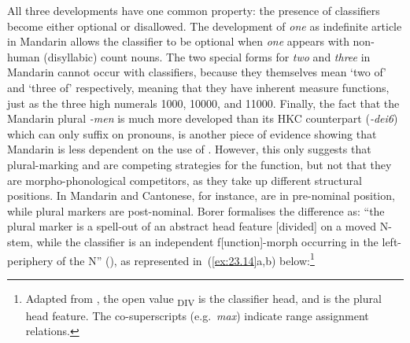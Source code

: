 \documentclass[output=paper]{langsci/langscibook}
\begin{document}
All three developments have one common property: the presence of classifiers
become either optional or disallowed. The development of \emph{one} as
indefinite article in Mandarin allows the classifier to be optional when
\emph{one} appears with non-human (disyllabic) count nouns. The two special
forms for \emph{two} and \emph{three} in Mandarin cannot occur with
classifiers, because they themselves mean ‘two of’ and ‘three of’ respectively,
meaning that they have inherent measure functions, just as the three high
numerals 1000, 10000, and 11000. Finally, the fact that the Mandarin plural
\emph{-men} is much more developed than its \gls{HKC} counterpart
(\emph{-dei6}) which can only suffix on pronouns, is another piece of evidence
showing that Mandarin  is less dependent on the use of .
However, this only suggests that plural-marking and  are competing
strategies for the  function, but not that they are
morpho-phonological competitors, as they take up different structural
positions. In Mandarin and Cantonese, for instance,  are in
pre-nominal position, while plural markers are post-nominal. Borer formalises
the difference as: “the plural marker is a spell-out of an abstract head
feature  [divided] on a moved N-stem, while the
classifier is an independent f[unction]-morph occurring in the
left-periphery of the N” (\citeyear[95]{Borer2005}), as represented in\largerpage\ 
(\ref{ex:23.14}a,b)
below:\footnote{Adapted from \citet[95]{Borer2005}, the open value
    \tuple{e}\textsubscript{DIV} is the classifier\is{classifiers} head, and
\tuple{div} is the plural head feature. The co-superscripts (e.g.\ \emph{max})
indicate range assignment relations.}\pagebreak
\end{document}
